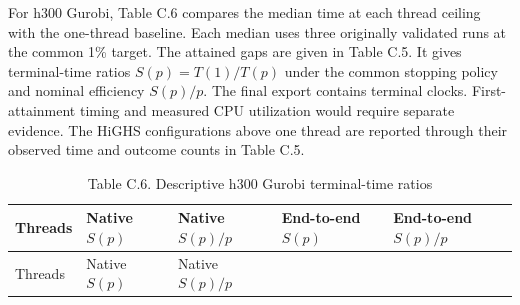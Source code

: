 \documentclass[
  english,
  11pt,
  a4paper,
]{article}
\begin{document}
For h300 Gurobi, Table C.6 compares the median time at each thread
ceiling with the one-thread baseline. Each
median uses three originally validated runs at the common 1\% target. The attained gaps are given in Table C.5.
It gives terminal-time ratios
\(S(p)=T(1)/T(p)\) under the common stopping policy and nominal
efficiency \(S(p)/p\). The final export contains terminal clocks.
First-attainment timing and measured CPU utilization would require
separate evidence. The HiGHS configurations above one thread are
reported through their observed time and outcome counts in Table C.5.

\begin{longtable}[]{@{}
  >{\raggedleft\arraybackslash}p{}
  >{\raggedleft\arraybackslash}p{}
  >{\raggedleft\arraybackslash}p{}
  >{\raggedleft\arraybackslash}p{}
  >{\raggedleft\arraybackslash}p{}@{}}
\caption{Table C.6. Descriptive h300 Gurobi terminal-time ratios}\tabularnewline
\toprule\noalign{}
\begin{minipage}[b]{\linewidth}\raggedleft
Threads
\end{minipage} & \begin{minipage}[b]{\linewidth}\raggedleft
Native \(S(p)\)
\end{minipage} & \begin{minipage}[b]{\linewidth}\raggedleft
Native \(S(p)/p\)
\end{minipage} & \begin{minipage}[b]{\linewidth}\raggedleft
End-to-end \(S(p)\)
\end{minipage} & \begin{minipage}[b]{\linewidth}\raggedleft
End-to-end \(S(p)/p\)
\end{minipage} \\
\midrule\noalign{}
\endfirsthead
\toprule\noalign{}
\begin{minipage}[b]{\linewidth}\raggedleft
Threads
\end{minipage} & \begin{minipage}[b]{\linewidth}\raggedleft
Native \(S(p)\)
\end{minipage} & \begin{minipage}[b]{\linewidth}\raggedleft
Native \(S(p)/p\)
\end{minipage} & \begin{minipage}[b]{\linewidth}\raggedleft

\end{minipage}
\end{longtable}
\end{document}
